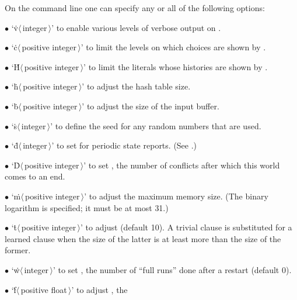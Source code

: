 On the command line one can specify any or all of the
following options:
\smallskip
\item{$\bullet$}
`\.v$\langle\,$integer$\,\rangle$' to enable various levels of verbose
output on .
\item{$\bullet$}
`\.c$\langle\,$positive integer$\,\rangle$' to limit the levels on which
choices are shown by .
\item{$\bullet$}
`\.H$\langle\,$positive integer$\,\rangle$' to limit the literals whose
histories are shown by .
\item{$\bullet$}
`\.h$\langle\,$positive integer$\,\rangle$' to adjust the hash table size.
\item{$\bullet$}
`\.b$\langle\,$positive integer$\,\rangle$' to adjust the size of the input
buffer.
\item{$\bullet$}
`\.s$\langle\,$integer$\,\rangle$' to define the seed for any random numbers
that are used.
\item{$\bullet$}
`\.d$\langle\,$integer$\,\rangle$' to set  for periodic state
reports.
(See .)
\item{$\bullet$}
`\.D$\langle\,$positive integer$\,\rangle$' to set , the
number of conflicts after which this world comes to an end.
\item{$\bullet$}
`\.m$\langle\,$positive integer$\,\rangle$' to adjust the maximum memory size.
(The binary logarithm is specified; it must be at most 31.)
\item{$\bullet$}
`\.t$\langle\,$positive integer$\,\rangle$' to adjust 
(default
10). A trivial clause is substituted for a learned clause when the size of the
latter is at least  more than the size of the former.
\item{$\bullet$}
`\.w$\langle\,$integer$\,\rangle$' to set , the number of
``full runs''
done after a restart (default 0).
\item{$\bullet$}
`\.f$\langle\,$positive float$\,\rangle$' to adjust , the

